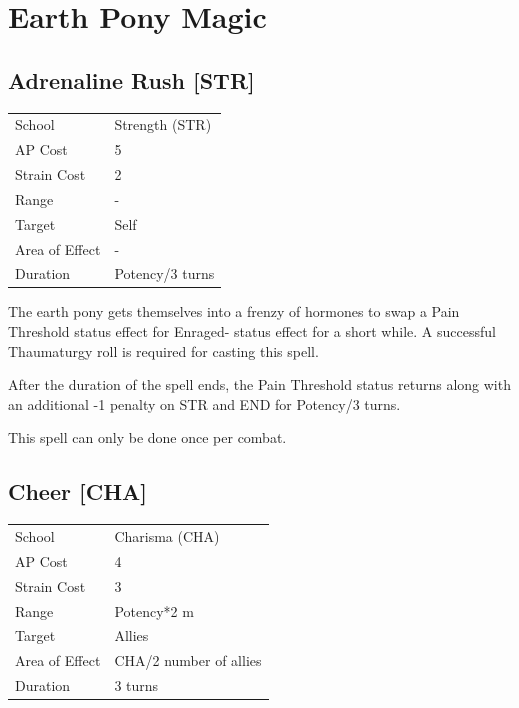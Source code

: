 \documentclass[11pt,a4paper,twocolumn]{book}
\begin{document}
\chapter{Earth Pony Magic}


\section*{Adrenaline Rush [STR]}
{
	\begin{tabu} to 75mm{| X[l,4] | X[l,7] |}
		\hline
		School 			& Strength (STR) 	\\
        AP Cost	      	& 5 				\\
        Strain Cost     & 2 				\\
        Range     		& - 				\\
        Target      	& Self 				\\
        Area of Effect  & - 	 			\\
        Duration     	& Potency/3 turns 	\\ \hline
	\end{tabu}
		
}

\medskip

The earth pony gets themselves into a frenzy of hormones to swap a Pain Threshold status effect for Enraged- status effect for a short while. A successful Thaumaturgy roll is required for casting this spell.

After the duration of the spell ends, the Pain Threshold status returns along with an additional -1 penalty on STR and END for Potency/3 turns.

This spell can only be done once per combat.

\vfill

\section*{Cheer [CHA]}
{
	\begin{tabu} to 75mm{| X[l,4] | X[l,7] |}
		\hline
		School 			& Charisma (CHA) 	\\
        AP Cost	      	& 4 				\\
        Strain Cost     & 3 				\\
        Range     		& Potency*2 m 		\\
        Target      	& Allies 			\\
        Area of Effect  & CHA/2 number of allies	 			\\
        Duration     	& 3 turns 			\\ \hline
	\end{tabu}
		
}
\end{document}
